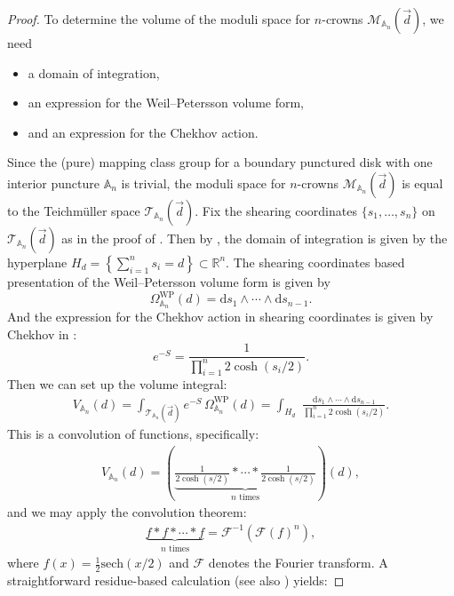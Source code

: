 \documentclass{amsart}
\renewcommand{\AA}{\mathbb{A}}
\newcommand{\RR}{\mathbb{R}}
\theoremstyle{definition}
\begin{document}
\begin{proof}

To determine the volume of the moduli space for $n$-crowns $\mathcal{M}_{\mathbb{A}_{n}}(\vec{d})$, we need
\begin{itemize}
    \item a domain of integration,
    \item an expression for the Weil--Petersson volume form,
    \item and an expression for the Chekhov action.
\end{itemize}
Since the (pure) mapping class group for a boundary punctured disk with one interior puncture $\AA_n$ is trivial, the moduli space for $n$-crowns $\mathcal{M}_{\mathbb{A}_{n}}(\vec{d})$ is equal to the Teichm\"uller space $\mathcal{T}_{\mathbb{A}_{n}}(\vec{d})$. Fix the shearing coordinates $\{s_1,\dotsc,s_n\}$ on $\mathcal{T}_{\mathbb{A}_{n}}(\vec{d})$ as in the proof of . Then by , the domain of integration is given by the hyperplane $H_d =\left\{\sum_{i=1}^n s_i =d\right\} \subset \RR^n$. The shearing coordinates based presentation of the Weil--Petersson volume form is given by
\[
\Omega^{\mathrm{WP}}_{\mathbb{A}_n}(d)= \mathrm{d}s_1 \wedge \cdots \wedge \mathrm{d}s_{n-1}.
\]
And the expression for the Chekhov action in shearing coordinates is given by Chekhov in \cite[Equation~5.1]{chekhov2024}:
\[
e^{-S} = \frac{1}{\prod_{i=1}^n 2\cosh (s_i/2)}.
\]
Then we can set up the volume integral:
\begin{align}
V_{\mathbb{A}_n}(d) 
= \int_{\mathcal{T}_{\mathbb{A}_{n}}(\vec{d})} e^{-S} \,\Omega^{\mathrm{WP}}_{\mathbb{A}_n}(d) 
= \int_{H_d} \,\, \frac{\mathrm{d}s_1 \wedge \cdots \wedge \mathrm{d}s_{n-1}}{ \prod_{i=1}^n 2\cosh (s_i/2)}.\label{eq:ncrownvolume}
\end{align}
This is a convolution of functions, specifically:
\begin{align}
V_{\mathbb{A}_n}(d) 
= \left(\underbrace{\frac{1}{2\cosh(s/2)} * \cdots * \frac{1}{2\cosh(s/2)}}_{n \text{ times}}\right)(d),
\end{align}
and we may apply the convolution theorem:
\begin{align}
\underbrace{f * f *  \cdots * f}_{{n \text{ times}}} = \mathcal{F}^{-1} (\mathcal{F}(f)^n),
\end{align}
where $f(x) = \frac{1}{2}\text{sech}(x/2)$ and $\mathcal{F}$ denotes the Fourier transform. A straightforward residue-based calculation (see also \cite[Equation~3.981(3)]{MR2360010}) yields:

\end{proof}
\end{document}
